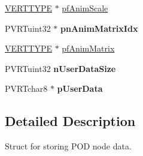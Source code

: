 \begin{DoxyCompactItemize}
\item 
\hyperlink{group___a_p_i___o_g_l_e_s_ga06da457b7d3e93368ab904f89e1396be}{V\+E\+R\+T\+T\+Y\+P\+E} $\ast$ \hyperlink{struct_s_p_o_d_node_ac5dc3ff874688075ee7d6e7af7c672cc}{pf\+Anim\+Scale}
\item 
\hypertarget{struct_s_p_o_d_node_a0890de3ee29a791cccf5c67900602cee}{P\+V\+R\+Tuint32 $\ast$ {\bfseries pn\+Anim\+Matrix\+Idx}}\label{struct_s_p_o_d_node_a0890de3ee29a791cccf5c67900602cee}

\item 
\hyperlink{group___a_p_i___o_g_l_e_s_ga06da457b7d3e93368ab904f89e1396be}{V\+E\+R\+T\+T\+Y\+P\+E} $\ast$ \hyperlink{struct_s_p_o_d_node_ad394fea8e28134bb668496a0d7d1386b}{pf\+Anim\+Matrix}
\item 
\hypertarget{struct_s_p_o_d_node_a5af4c7a4a0b58dd82595b1d48f5a5213}{P\+V\+R\+Tuint32 {\bfseries n\+User\+Data\+Size}}\label{struct_s_p_o_d_node_a5af4c7a4a0b58dd82595b1d48f5a5213}

\item 
\hypertarget{struct_s_p_o_d_node_afb3a46f055ccf7f14b7eb460f82d9a3a}{P\+V\+R\+Tchar8 $\ast$ {\bfseries p\+User\+Data}}\label{struct_s_p_o_d_node_afb3a46f055ccf7f14b7eb460f82d9a3a}

\end{DoxyCompactItemize}


\subsection{Detailed Description}
Struct for storing P\+O\+D node data. 



 

